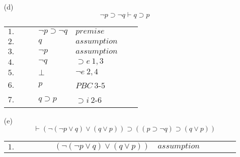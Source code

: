 \documentclass[12pt]{article}
\begin{document}
\begin{itemize}
	\item[(d)]
		\[
			\neg p \supset \neg q \vdash q \supset p
		\]
		\begin{table}[H]
		\centering
		\begin{tabular}{*7{l}}
			$1.$ & & & $\neg p \supset \neg q$ & $premise$ & & \\
			
			\cline{2-7}
			
			$2.$ &\multicolumn{1}{|c}{} & & $q$ & $assumption$ & &\multicolumn{1}{c|}{}\\
			\cline{3-6}
			
			$3.$ & \multicolumn{1}{|c}{} & \multicolumn{1}{|c}{}  & $\neg p$ & $assumption$ & \multicolumn{1}{c|}{} &\multicolumn{1}{c|}{}\\
			
			$4.$ & \multicolumn{1}{|c}{} & \multicolumn{1}{|c}{}  & $\neg q$ & $\supset e \ 1, 3$ & \multicolumn{1}{c|}{} &\multicolumn{1}{c|}{}\\
			
			$5.$ & \multicolumn{1}{|c}{} & \multicolumn{1}{|c}{}  & $\bot$ & $\neg e \ 2, 4$ & \multicolumn{1}{c|}{} &\multicolumn{1}{c|}{}\\
			
			\cline{3-6}
			
			$6.$ &\multicolumn{1}{|c}{} & & $p$ & $PBC \ 3$-$5$ & &\multicolumn{1}{c|}{}\\
			
			\cline{2-7}
			
			$7.$ & & & $q \supset p$ & $\supset i \ 2$-$6$ & & \\

			
		
		\end{tabular}
		\end{table}

		
		
	\item[(e)]
		\[
			\vdash (\neg (\neg p \lor q) \lor (q \lor p)) \supset ((p \supset \neg q) \supset (q \lor p))
		\]
		\begin{table}[H]
		\centering
		\begin{tabular}{*{11}{l}}
			
			\cline{2-11}
			
			$1.$ &\multicolumn{1}{|c}{} & & & & $(\neg (\neg p \lor q) \lor (q \lor p))$ & $assumption$ & & & &\multicolumn{1}{c|}{}\\
						
			\cline{3-10}
			

\end{tabular}
\end{table}
\end{itemize}
\end{document}
